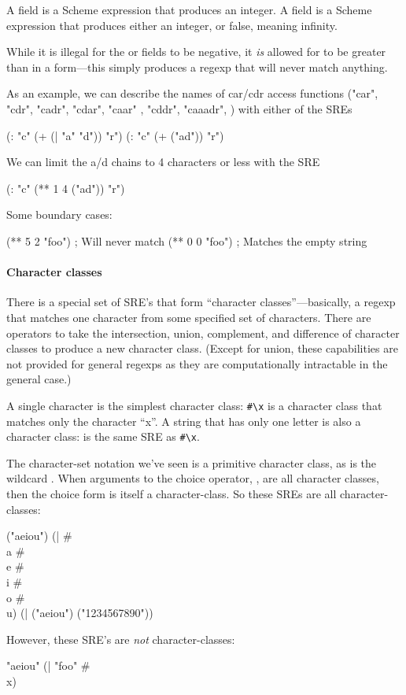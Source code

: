 A  field is a Scheme expression that produces an integer.
A  field is a Scheme expression that produces either an integer,
or false, meaning infinity.

While it is illegal for the  or  fields to be negative, 
it \emph{is} allowed for  to be greater than  in a 
\ex{**} form---this simply produces a regexp that will never match anything.

As an example, we can describe the names of car/cdr access functions
("car", "cdr", "cadr", "cdar", "caar" , "cddr", "caaadr", \etc) with
either of the SREs
\begin{code}
    (: "c" (+ (| "a" "d")) "r")
    (: "c" (+ ("ad")) "r")\end{code}
We can limit the a/d chains to 4 characters or less with the SRE
\begin{code}
    (: "c" (** 1 4 ("ad")) "r")\end{code}

Some boundary cases:
\begin{code}
    (** 5 2 "foo")      ; Will never match
    (** 0 0 "foo")      ; Matches the empty string\end{code}

\paragraph{Character classes}

There is a special set of SRE's that form ``character classes''---basically, 
a regexp that matches one character from some specified set of characters.
There are operators to take the intersection, union, complement, and
difference of character classes to produce a new character class. (Except 
for union, these capabilities are not provided for general regexps as they 
are computationally intractable in the general case.)

A single character is the simplest character class: \verb|#\x| is a character
class that matches only the character ``x''.  A string that has only one
letter is also a character class:  is the same SRE as \verb|#\x|.

The character-set notation  we've seen is a primitive character
class, as is the wildcard . 
When arguments to the choice operator, \ex{|}, are
all character classes, then the choice form is itself a character-class. 
So these SREs are all character-classes:
\begin{code}
("aeiou")
(| #\\a #\\e #\\i #\\o #\\u)
(| ("aeiou") ("1234567890"))\end{code}
However, these SRE's are \emph{not} character-classes:
\begin{code}
"aeiou"
(| "foo" #\\x)\end{code}

